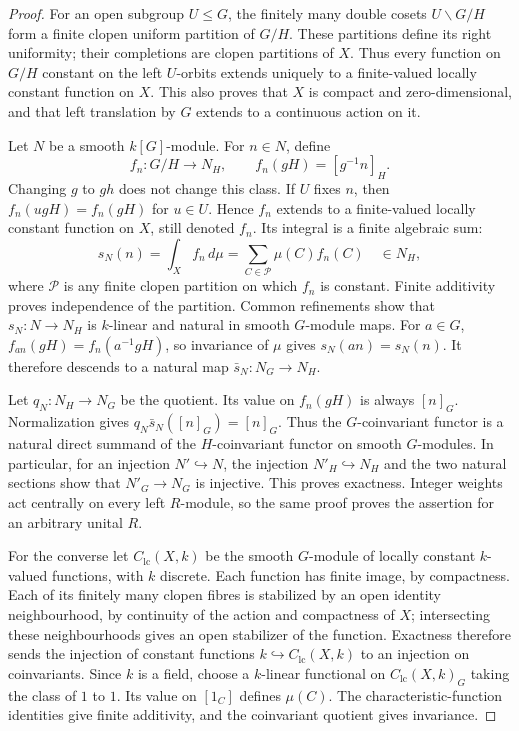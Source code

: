 \begin{proof}
For an open subgroup $U\leq G$, the finitely many double cosets
$U\backslash G/H$ form a finite clopen uniform partition of $G/H$.
These partitions define its right uniformity; their completions are
clopen partitions of $X$. Thus every function on $G/H$ constant on
the left $U$-orbits extends uniquely to a finite-valued locally
constant function on $X$. This also proves that $X$ is compact and
zero-dimensional, and that left translation by $G$ extends to a
continuous action on it.

Let $N$ be a smooth $k[G]$-module. For $n\in N$, define
\[
 f_n:G/H\longrightarrow N_H,\qquad f_n(gH)=[g^{-1}n]_H.
\]
Changing $g$ to $gh$ does not change this class. If $U$ fixes $n$,
then $f_n(ugH)=f_n(gH)$ for $u\in U$. Hence $f_n$ extends to a
finite-valued locally constant function on $X$, still denoted $f_n$.
Its integral is a finite algebraic sum:
\[
 s_N(n)=\int_X f_n\,d\mu
       =\sum_{C\in\mathcal P}\mu(C)f_n(C)\quad\in N_H,
\]
where $\mathcal P$ is any finite clopen partition on which $f_n$ is
constant. Finite additivity proves independence of the partition.
Common refinements show that $s_N:N\to N_H$ is $k$-linear and
natural in smooth $G$-module maps. For $a\in G$,
$f_{an}(gH)=f_n(a^{-1}gH)$, so invariance of $\mu$ gives
$s_N(an)=s_N(n)$. It therefore descends to a natural map
$\bar s_N:N_G\to N_H$.

Let $q_N:N_H\to N_G$ be the quotient. Its value on $f_n(gH)$ is
always $[n]_G$. Normalization gives
$q_N\bar s_N([n]_G)=[n]_G$. Thus the $G$-coinvariant functor is a
natural direct summand of the $H$-coinvariant functor on smooth
$G$-modules. In particular, for an injection $N'\hookrightarrow N$,
the injection $N'_H\hookrightarrow N_H$ and the two natural sections
show that $N'_G\to N_G$ is injective. This proves exactness. Integer
weights act centrally on every left $R$-module, so the same proof
proves the assertion for an arbitrary unital $R$.

For the converse let $C_{\mathrm{lc}}(X,k)$ be the smooth $G$-module
of locally constant $k$-valued functions, with $k$ discrete. Each
function has finite image, by compactness. Each of its finitely many
clopen fibres is stabilized by an open identity neighbourhood, by
continuity of the action and compactness of $X$; intersecting these
neighbourhoods gives an open stabilizer of the function. Exactness
therefore sends the injection of constant functions
$k\hookrightarrow C_{\mathrm{lc}}(X,k)$ to an injection on
coinvariants. Since $k$ is a field, choose a $k$-linear functional
on $C_{\mathrm{lc}}(X,k)_G$ taking the class of $1$ to $1$.
Its value on $[1_C]$ defines $\mu(C)$. The characteristic-function
identities give finite additivity, and the coinvariant quotient
gives invariance.


\end{proof}
